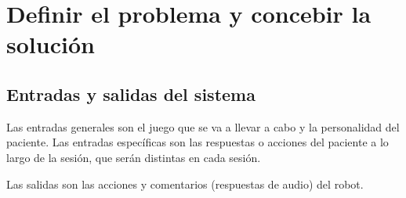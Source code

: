 \documentclass{uc3mpracticas}
\begin{document}
  \section{Definir el problema y concebir la solución}
  \subsection{Entradas y salidas del sistema}

  Las entradas generales son el juego que se va a llevar a cabo y la personalidad del paciente. Las entradas específicas son las respuestas o acciones del paciente a lo largo de la sesión, que serán distintas en cada sesión.

  \vspace{2mm}

  Las salidas son las acciones y comentarios (respuestas de audio) del robot.
\end{document}
